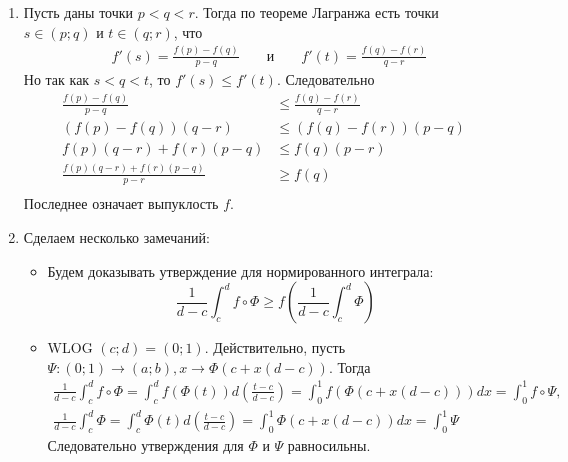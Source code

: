 \documentclass[12pt,a4paper]{article}
\begin{document}
\begin{enumproblem}
\begin{enumerate}
            \item Пусть даны точки $p < q < r$. Тогда по теореме Лагранжа есть точки $s \in (p; q)$ и $t \in (q; r)$, что
            \begin{align*}
                &f'(s) = \frac{f(p) - f(q)}{p - q}&
                &\text{ и }&
                &f'(t) = \frac{f(q) - f(r)}{q - r}
            \end{align*}
            Но так как $s < q < t$, то $f'(s) \leqslant f'(t)$. Следовательно
            \begin{align*}
                \frac{f(p) - f(q)}{p - q} &\leqslant \frac{f(q) - f(r)}{q - r}\\
                (f(p) - f(q))(q - r) &\leqslant (f(q) - f(r))(p - q)\\
                f(p)(q - r) + f(r)(p - q) &\leqslant f(q)(p - r)\\
                \frac{f(p)(q - r) + f(r)(p - q)}{p - r} &\geqslant f(q)\\
            \end{align*}
            Последнее означает выпуклость $f$.

            \item Сделаем несколько замечаний:
            \begin{itemize}
                \item Будем доказывать утверждение для нормированного интеграла:
                    \[\frac{1}{d-c} \int_c^d f \circ \Phi \geqslant f\left(\frac{1}{d-c}\int_c^d \Phi\right)\]

                \item WLOG $(c; d) = (0; 1)$. Действительно, пусть $\Psi: (0; 1) \to (a; b), x \to \Phi(c + x(d - c))$. Тогда
                    \begin{gather*}
                        \frac{1}{d-c} \int_c^d f \circ \Phi
                        = \int_c^d f(\Phi(t)) d\left(\frac{t - c}{d - c}\right)
                        = \int_0^1 f(\Phi(c + x(d - c))) dx
                        = \int_0^1 f \circ \Psi,
                        \\
                        \frac{1}{d-c} \int_c^d \Phi
                        = \int_c^d \Phi(t) d\left(\frac{t - c}{d - c}\right)
                        = \int_0^1 \Phi(c + x(d - c)) dx
                        = \int_0^1 \Psi
                    \end{gather*}
                    Следовательно утверждения для $\Phi$ и $\Psi$ равносильны.
                    

\end{itemize}
\end{enumerate}
\end{enumproblem}
\end{document}
